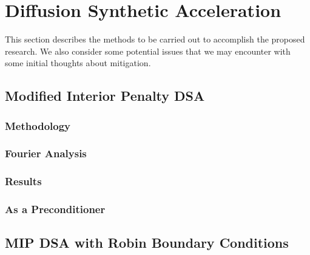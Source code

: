 \documentclass[12pt]{article}
\begin{document}
\section{Diffusion Synthetic Acceleration}
\label{sec:DSA}
This section describes the methods to be carried out to accomplish the proposed research. We also consider some potential issues that we may encounter with some initial thoughts about mitigation. 

\subsection{Modified Interior Penalty DSA}

\subsubsection{Methodology}
\subsubsection{Fourier Analysis}
\subsubsection{Results}
\subsubsection{As a Preconditioner}

\subsection{MIP DSA with Robin Boundary Conditions}
\end{document}
